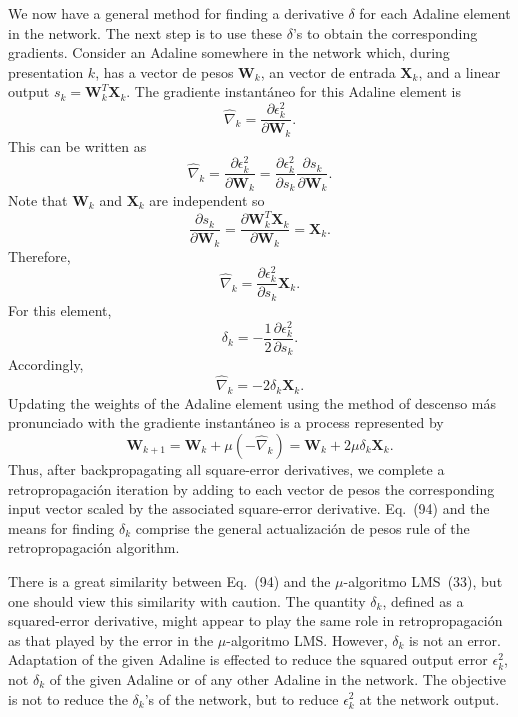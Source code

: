 \documentclass[10pt,twocolumn]{article}
\newcommand{\X}{\bm{X}}
\newcommand{\W}{\bm{W}}
\begin{document}
We now have a general method for finding a derivative $\delta$ for each Adaline
element in the network. The next step is to use these $\delta$'s to obtain the
corresponding gradients. Consider an Adaline somewhere in the network which, during
presentation $k$, has a vector de pesos $\W_k$, an vector de entrada $\X_k$, and a linear
output $s_k = \W_k^{T}\X_k$. The gradiente instantáneo for this Adaline element is
\begin{equation}
\hat{\nabla}_k = \frac{\partial\epsilon_k^2}{\partial\W_k}. \tag{88}
\end{equation}
This can be written as
\begin{equation}
\hat{\nabla}_k = \frac{\partial\epsilon_k^2}{\partial\W_k}
= \frac{\partial\epsilon_k^2}{\partial s_k}\frac{\partial s_k}{\partial\W_k}. \tag{89}
\end{equation}
Note that $\W_k$ and $\X_k$ are independent so
\begin{equation}
\frac{\partial s_k}{\partial\W_k} = \frac{\partial\W_k^{T}\X_k}{\partial\W_k} = \X_k. \tag{90}
\end{equation}
Therefore,
\begin{equation}
\hat{\nabla}_k = \frac{\partial\epsilon_k^2}{\partial s_k}\X_k. \tag{91}
\end{equation}
For this element,
\begin{equation}
\delta_k = -\frac{1}{2}\frac{\partial\epsilon_k^2}{\partial s_k}. \tag{92}
\end{equation}
Accordingly,
\begin{equation}
\hat{\nabla}_k = -2\delta_k\X_k. \tag{93}
\end{equation}
Updating the weights of the Adaline element using the method of descenso más pronunciado
with the gradiente instantáneo is a process represented by
\begin{equation}
\W_{k+1} = \W_k + \mu(-\hat{\nabla}_k) = \W_k + 2\mu\delta_k\X_k. \tag{94}
\end{equation}
Thus, after backpropagating all square-error derivatives, we complete a
retropropagación iteration by adding to each vector de pesos the corresponding input
vector scaled by the associated square-error derivative. Eq.~(94) and the means for
finding $\delta_k$ comprise the general actualización de pesos rule of the retropropagación
algorithm.

There is a great similarity between Eq.~(94) and the $\mu$-algoritmo LMS~(33), but
one should view this similarity with caution. The quantity $\delta_k$, defined as a
squared-error derivative, might appear to play the same role in retropropagación as
that played by the error in the $\mu$-algoritmo LMS. However, $\delta_k$ is not an
error. Adaptation of the given Adaline is effected to reduce the squared output
error $\epsilon_k^2$, not $\delta_k$ of the given Adaline or of any other Adaline in
the network. The objective is not to reduce the $\delta_k$'s of the network, but to
reduce $\epsilon_k^2$ at the network output.
\end{document}
